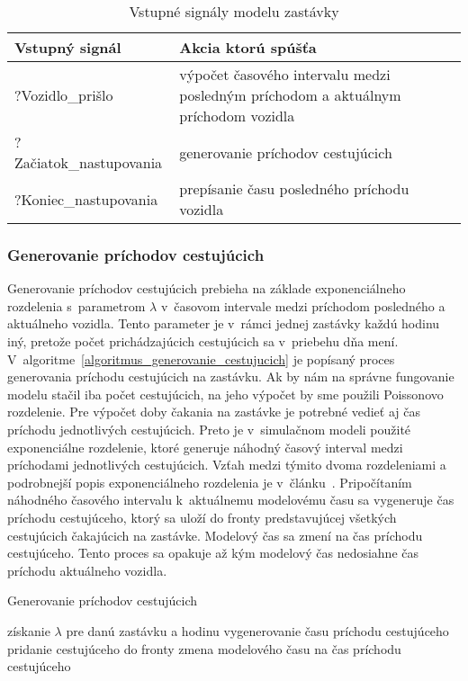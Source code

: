 \begin{table}[h]\label{tab:inputs_zastavky}
  \centering
  \begin{tabularx}{\textwidth}{|l|X|}
    \hline
    \textbf{Vstupný signál} & \textbf{Akcia ktorú spúšťa} \\ \hline
    ?Vozidlo\_prišlo & výpočet časového intervalu medzi posledným príchodom a aktuálnym príchodom vozidla \\ \hline
    ?Začiatok\_nastupovania & generovanie príchodov cestujúcich \\ \hline
    ?Koniec\_nastupovania & prepísanie času posledného príchodu vozidla \\ \hline
  \end{tabularx}
  \caption{Vstupné signály modelu zastávky}
\end{table}

\subsubsection*{Generovanie príchodov cestujúcich}
Generovanie príchodov cestujúcich prebieha na základe exponenciálneho rozdelenia s~parametrom $\lambda$ v~časovom intervale medzi príchodom posledného a aktuálneho vozidla.
Tento parameter je v~rámci jednej zastávky každú hodinu iný, pretože počet prichádzajúcich cestujúcich sa v~priebehu dňa mení.
V~algoritme~\ref{algoritmus_generovanie_cestujucich} je popísaný proces generovania príchodu cestujúcich na zastávku.
Ak by nám na správne fungovanie modelu stačil iba počet cestujúcich, na jeho výpočet by sme použili Poissonovo rozdelenie.
Pre výpočet doby čakania na zastávke je potrebné vedieť aj čas príchodu jednotlivých cestujúcich.
Preto je v~simulačnom modeli použité exponenciálne rozdelenie, ktoré generuje náhodný časový interval medzi príchodami jednotlivých cestujúcich.
Vzťah medzi týmito dvoma rozdeleniami a podrobnejší popis exponenciálneho rozdelenia je v~článku~\cite{geraghty2022exponential}.
Pripočítaním náhodného časového intervalu k~aktuálnemu modelovému času sa vygeneruje čas príchodu cestujúceho, ktorý sa uloží do fronty predstavujúcej všetkých cestujúcich čakajúcich na zastávke.
Modelový čas sa zmení na čas príchodu cestujúceho.
Tento proces sa opakuje až kým modelový čas nedosiahne čas príchodu aktuálneho vozidla.

\vspace*{\dimexpr0.5\baselineskip\relax}
\begin{algorithm}[H]\label{algoritmus_generovanie_cestujucich}
\caption{Generovanie príchodov cestujúcich}
  získanie $\lambda$ pre danú zastávku a hodinu\;
   {
    vygenerovanie času príchodu cestujúceho\;
    pridanie cestujúceho do fronty\;
    zmena modelového času na čas príchodu cestujúceho\;
  }
\end{algorithm}

